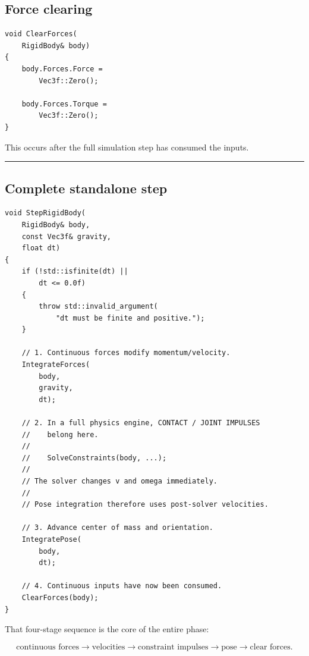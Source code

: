\subsection{Force clearing}\label{06-engine-ii-ch039-force-clearing}

\hypertarget{06-engine-ii-ch039-force-clearing}{}

\begin{verbatim}
void ClearForces(
    RigidBody& body)
{
    body.Forces.Force =
        Vec3f::Zero();

    body.Forces.Torque =
        Vec3f::Zero();
}
\end{verbatim}

This occurs after the full simulation step has consumed the inputs.

\begin{center}\rule{0.5\linewidth}{0.5pt}\end{center}

\subsection{Complete standalone step}\label{06-engine-ii-ch039-complete-standalone-step}

\hypertarget{06-engine-ii-ch039-complete-standalone-step}{}

\begin{verbatim}
void StepRigidBody(
    RigidBody& body,
    const Vec3f& gravity,
    float dt)
{
    if (!std::isfinite(dt) ||
        dt <= 0.0f)
    {
        throw std::invalid_argument(
            "dt must be finite and positive.");
    }

    // 1. Continuous forces modify momentum/velocity.
    IntegrateForces(
        body,
        gravity,
        dt);

    // 2. In a full physics engine, CONTACT / JOINT IMPULSES
    //    belong here.
    //
    //    SolveConstraints(body, ...);
    //
    // The solver changes v and omega immediately.
    //
    // Pose integration therefore uses post-solver velocities.

    // 3. Advance center of mass and orientation.
    IntegratePose(
        body,
        dt);

    // 4. Continuous inputs have now been consumed.
    ClearForces(body);
}
\end{verbatim}

That four-stage sequence is the core of the entire phase:

\[
\boxed{
\text{continuous forces}
\rightarrow
\text{velocities}
\rightarrow
\text{constraint impulses}
\rightarrow
\text{pose}
\rightarrow
\text{clear forces}.
}
\]

